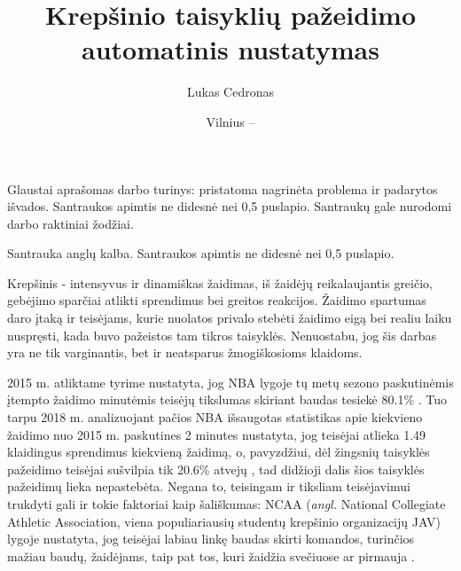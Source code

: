 \documentclass{VUMIFPSbakalaurinis}
\institute{Informatikos institutas}  %
\title{Krepšinio taisyklių pažeidimo automatinis nustatymas	}
\author{Lukas Cedronas}
\date{Vilnius – \the\year}
\begin{document}
\maketitle
\setcounter{page}{2}


Glaustai aprašomas darbo turinys: pristatoma nagrinėta problema ir padarytos
išvados. Santraukos apimtis ne didesnė nei 0,5 puslapio. Santraukų gale
nurodomi darbo raktiniai žodžiai. 

Santrauka anglų kalba. Santraukos apimtis ne didesnė nei 0,5 puslapio.

\tableofcontents



Krepšinis - intensyvus ir dinamiškas žaidimas, iš žaidėjų reikalaujantis greičio, gebėjimo sparčiai atlikti sprendimus bei greitos reakcijos. Žaidimo spartumas daro įtaką ir teisėjams, kurie nuolatos privalo stebėti žaidimo eigą bei realiu laiku nuspręsti, kada buvo pažeistos tam tikros taisyklės. Nenuostabu, jog šis darbas yra ne tik varginantis, bet ir neatsparus žmogiškosioms klaidoms. 

2015 m. atliktame tyrime nustatyta, jog NBA lygoje tų metų sezono paskutinėmis įtempto žaidimo minutėmis teisėjų tikslumas skiriant baudas tesiekė 80.1\% \cite{NBA_bias_Referee}. Tuo tarpu 2018 m. analizuojant pačios NBA išsaugotas statistikas apie kiekvieno žaidimo nuo 2015 m. paskutines 2 minutes nustatyta, jog teisėjai atlieka 1.49 klaidingus sprendimus kiekvieną žaidimą, o, pavyzdžiui, dėl žingsnių taisyklės pažeidimo teisėjai sušvilpia tik 20.6\% atvejų \cite{SiglerK}, tad didžioji dalis šios taisyklės pažeidimų lieka nepastebėta. Negana to, teisingam ir tiksliam teisėjavimui trukdyti gali ir tokie faktoriai kaip šališkumas: NCAA (\textit{angl.} National Collegiate Athletic Association, viena populiariausių studentų krepšinio organizacijų JAV) lygoje nustatyta, jog teisėjai labiau linkę baudas skirti komandos, turinčios mažiau baudų, žaidėjams, taip pat tos, kuri žaidžia svečiuose ar pirmauja \cite{OfficiatingBias}. 
\end{document}
